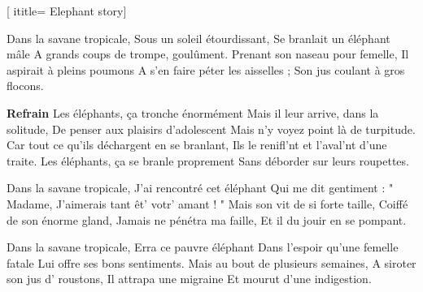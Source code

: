  [
ititle= {Elephant story}]


\beginverse
Dans la savane tropicale,
Sous un soleil étourdissant,
Se branlait un éléphant mâle
A grands coups de trompe, goulûment.
Prenant son naseau pour femelle,
Il aspirait à pleins poumons
A s'en faire péter les aisselles ;
Son jus coulant à gros flocons.
\endverse

\beginchorus
\textbf {Refrain}
Les éléphants, ça tronche énormément
Mais il leur arrive, dans la solitude,
De penser aux plaisirs d'adolescent
Mais n'y voyez point là de turpitude.
Car tout ce qu'ils déchargent en se branlant,
Ils le renifl'nt et l'aval'nt d'une traite.
Les éléphants, ça se branle proprement
Sans déborder sur leurs roupettes.
\endchorus

\beginverse
Dans la savane tropicale,
J'ai rencontré cet éléphant
Qui me dit gentiment : " Madame,
J'aimerais tant êt' votr' amant ! "
Mais son vit de si forte taille,
Coiffé de son énorme gland,
Jamais ne pénétra ma faille,
Et il du jouir en se pompant.
\endverse

\beginverse
Dans la savane tropicale,
Erra ce pauvre éléphant
Dans l'espoir qu'une femelle fatale
Lui offre ses bons sentiments.
Mais au bout de plusieurs semaines,
A siroter son jus d' roustons,
Il attrapa une migraine
Et mourut d'une indigestion.
\endverse

\endsong